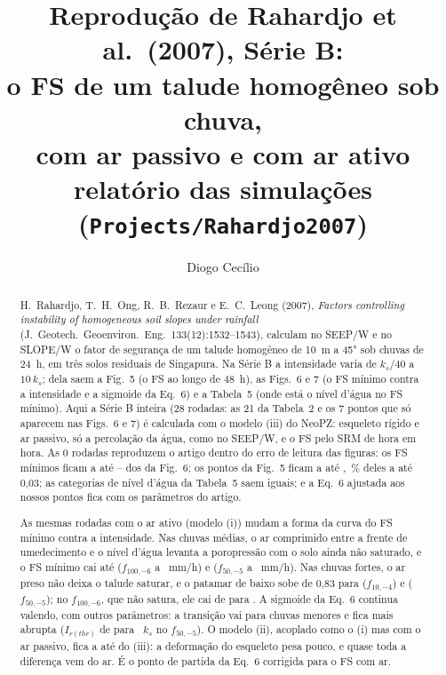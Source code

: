 \documentclass[11pt,a4paper]{article}
\title{Reprodução de Rahardjo et al.\ (2007), Série B:\\ o FS de um talude homogêneo sob chuva,\\ com ar passivo e com
ar ativo\\ \large relatório das simulações (\texttt{Projects/Rahardjo2007})}
\author{Diogo Cecílio}
\date{\versao}
\providecommand{\nFeitos}{0}\providecommand{\nTotal}{28}\providecommand{\difMedia}{--}\providecommand{\difMax}{--}
\begin{document}
\maketitle

\begin{abstract}
H.~Rahardjo, T.~H.~Ong, R.~B.~Rezaur e E.~C.~Leong (2007), \emph{Factors controlling instability of homogeneous soil
slopes under rainfall} (J.\ Geotech.\ Geoenviron.\ Eng.\ 133(12):1532--1543), calculam no SEEP/W e no SLOPE/W o fator de
segurança de um talude homogêneo de 10~m a 45° sob chuvas de 24~h, em três solos residuais de Singapura. Na Série B a
intensidade varia de $k_s/40$ a $10\,k_s$; dela saem a Fig.~5 (o FS ao longo de 48~h), as Figs.~6 e 7 (o FS mínimo
contra a intensidade e a sigmoide da Eq.~6) e a Tabela~5 (onde está o nível d'água no FS mínimo). Aqui a Série B inteira
(28 rodadas: as 21 da Tabela~2 e os 7 pontos que só aparecem nas Figs.~6 e 7) é calculada com o modelo (iii) do
NeoPZ: esqueleto rígido e ar passivo, só a percolação da água, como no SEEP/W, e o FS pelo SRM de hora em hora.
As \nFeitos{} rodadas reproduzem o artigo dentro do erro de leitura das figuras: os FS mínimos ficam a até \difMax{}
dos da Fig.~6; os \cincoN{} pontos da Fig.~5 ficam a até \cincoMax{}, \cincoFrac\,\% deles a até 0,03; as \catTot{}
categorias de nível d'água da Tabela~5 saem iguais; e a Eq.~6 ajustada aos nossos pontos fica com os parâmetros do
artigo.

As mesmas rodadas com o ar ativo (modelo (i)) mudam a forma da curva do FS mínimo contra a intensidade. Nas chuvas
médias, o ar comprimido entre a frente de umedecimento e o nível d'água levanta a poropressão com o solo ainda não
saturado, e o FS mínimo cai até \quedaCem{} ($f_{100,-6}$ a \quedaCemI~mm/h) e \quedaCinq{} ($f_{50,-5}$ a
\quedaCinqI~mm/h). Nas chuvas fortes,
o ar preso não deixa o talude saturar, e o patamar de baixo sobe de 0,83 para \AUmDez{} ($f_{10,-4}$) e \AUmCinq{}
($f_{50,-5}$); no $f_{100,-6}$, que não satura, ele cai de \ATresCem{} para \AUmCem. A sigmoide da Eq.~6 continua
valendo, com outros parâmetros: a transição vai para chuvas menores e fica mais abrupta ($I_{r(thr)}$ de \ThrksTresCinq{}
para \ThrksUmCinq~$k_s$ no $f_{50,-5}$). O modelo (ii), acoplado como o (i) mas com o ar passivo, fica a até 
do (iii): a deformação do esqueleto pesa pouco, e quase toda a diferença vem do ar. É o ponto de partida da Eq.~6
corrigida para o FS com ar.
\end{abstract}

\tableofcontents
\end{document}
